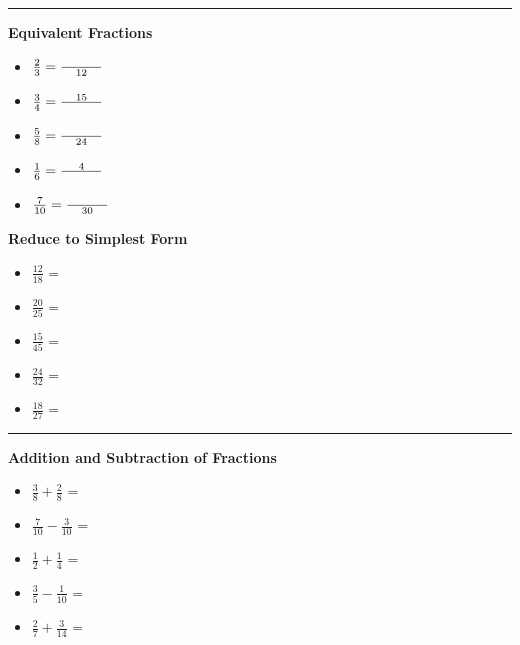 \documentclass[11pt]{article}
\begin{document}
{\begin{itemize}
\end{itemize}

\vspace{0.3cm}
\hrule
\vspace{0.3cm}

\textbf{Equivalent Fractions}

\begin{itemize}

\item $\frac{2}{3} = \frac{\text{\hspace{1cm}}}{12}$
\item $\frac{3}{4} = \frac{15}{\text{\hspace{1cm}}}$
\item $\frac{5}{8} = \frac{\text{\hspace{1cm}}}{24}$
\item $\frac{1}{6} = \frac{4}{\text{\hspace{1cm}}}$
\item $\frac{7}{10} = \frac{\text{\hspace{1cm}}}{30}$

\end{itemize}

\newpage
\vspace{0.3cm}

\textbf{Reduce to Simplest Form}

\begin{itemize}

\item $\frac{12}{18}$ = \underline{\hspace{1.5cm}}
\item $\frac{20}{25}$ = \underline{\hspace{1.5cm}}
\item $\frac{15}{45}$ = \underline{\hspace{1.5cm}}
\item $\frac{24}{32}$ = \underline{\hspace{1.5cm}}
\item $\frac{18}{27}$ = \underline{\hspace{1.5cm}}

\end{itemize}
\vspace{0.3cm}
\hrule
\vspace{0.3cm}

\textbf{Addition and Subtraction of Fractions}


\begin{itemize}


\item $\frac{3}{8} + \frac{2}{8}$ = \underline{\hspace{1.5cm}}
\item $\frac{7}{10} - \frac{3}{10}$ = \underline{\hspace{1.5cm}}
\item $\frac{1}{2} + \frac{1}{4}$ = \underline{\hspace{1.5cm}}
\item $\frac{3}{5} - \frac{1}{10}$ = \underline{\hspace{1.5cm}}
\item $\frac{2}{7} + \frac{3}{14}$ = \underline{\hspace{1.5cm}}


\end{itemize}}
\end{document}
